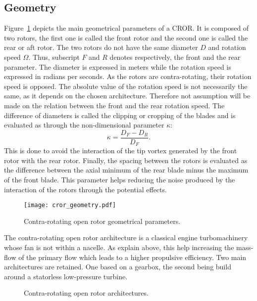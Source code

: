 
\subsection{Geometry}
\label{sub:cror_geometry}

Figure~\ref{fig:cror_geometry} depicts the main
geometrical parameters of a CROR.
It is composed of two rotors, the first one is called
the front rotor and the second one is called the rear or aft rotor.
The two rotors do not have the same diameter $D$ and rotation speed
$\Omega$. Thus, subscript $F$ and $R$ denotes respectively,
the front and the rear parameter. The diameter is expressed in meters
while the rotation speed is expressed in radians per seconds.
As the rotors are contra-rotating, their rotation speed is opposed.
The absolute value of the rotation speed is not necessarily the same,
as it depends on the chosen architecture. Therefore not assumption
will be made on the relation between the front and the rear
rotation speed.
The difference of diameters is called the clipping or cropping
of the blades and is evaluated as through the non-dimensional parameter
$\kappa$:
\begin{equation}
    \kappa = \frac{D_F - D_R}{D_F}.
\end{equation}
This is done to avoid the interaction of the tip vortex generated
by the front rotor with the rear rotor.
Finally, the spacing between the rotors
is evaluated as the difference between the axial minimum of the
rear blade minus the maximum of the front blade. This parameter
helps reducing the noise produced by the interaction of
the rotors through the potential effects.
\begin{figure}[htbp]
  \centering
  \texttt{[image: cror\_geometry.pdf]}
  \caption{Contra-rotating open rotor geometrical parameters.}
  \label{fig:cror_geometry}
\end{figure}

The contra-rotating open rotor architecture is a classical engine
turbomachinery whose fan is not within a nacelle. As explain
above, this help increasing the mass-flow of the primary flow
which leads to a higher propulsive efficiency.
Two main architectures are retained. One based on a gearbox, the second
being build around a statorless low-pressure turbine.
\begin{figure}[htb]
  \centering
  \caption{Contra-rotating open rotor architectures.}
  \label{fig:cror_architectures}
\end{figure}

